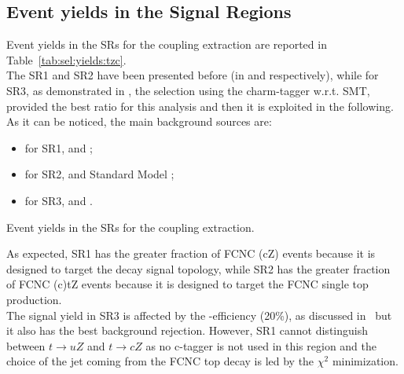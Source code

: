 \subsection{Event yields in the Signal Regions}
Event yields in the SRs for the \tZc coupling extraction are reported in Table~\ref{tab:sel:yields:tzc}.\\
The SR1 and SR2 have been presented before (in  and  respectively),
while for SR3, as demonstrated in , the selection using the charm-tagger \DLrc
w.r.t. SMT, provided the best \ssplusb ratio for this analysis and then it is exploited in the following.\\
As it can be noticed, the main background sources are:
\begin{itemize}
	\item for SR1\tZc, \ttZ and \VVHF;
	\item for SR2\tZc, \VVHF and Standard Model \tZq ;
	\item for SR3\tZc, \ttZ and \VVHF .
\end{itemize}

\begin{table}[!htbp]
	\centering
	\small
	
	\caption{Event yields in the SRs for the \tZc coupling extraction. \TabErrStatOnly} 
	\label{tab:sel:yields:tzc}
\end{table} 
\noindent As expected, SR1 has the greater fraction of FCNC \ttbar(cZ) events because it is designed to target the decay signal topology, while SR2 has the greater fraction of FCNC (c)tZ events because it is designed to target the FCNC single top production.\\
The signal yield in SR3 is affected by the \DLrc  \Pqc-efficiency (20\%), as discussed in~ but it also has the best background rejection. However, SR1 cannot distinguish between $t\rightarrow uZ$ and $t\rightarrow cZ$ as no c-tagger is not used in this region and the choice of the jet coming from the FCNC top decay is led by the $\chi^2$ minimization.

\clearpage

